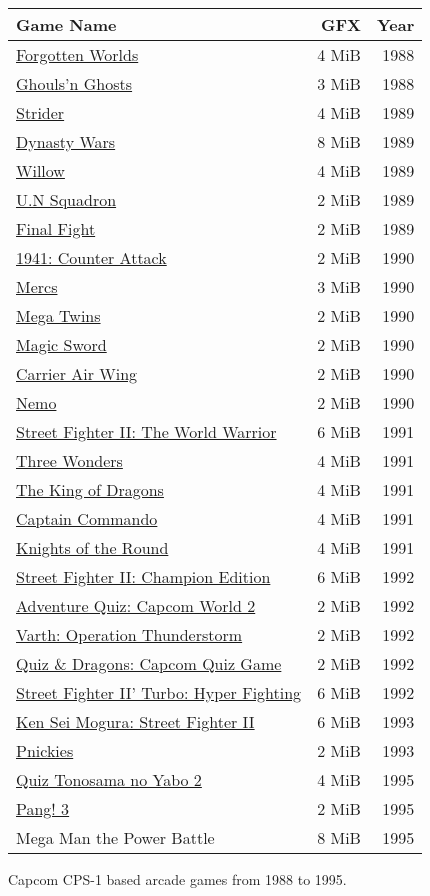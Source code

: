 \begin{figure}[H]
{ \setlength{\tabcolsep}{3.0pt}
\begin{tabularx}{\textwidth}{Xrr} 
  \textbf{Game Name} & \textbf{ GFX }  & \textbf{ Year } \\               
  \toprule    
\href{}{Forgotten Worlds} & 4 MiB & 1988 \\ 
\href{}{Ghouls'n Ghosts} & 3 MiB & 1988 \\ 
  \toprule    
\href{}{Strider} & 4 MiB & 1989 \\ 
\href{}{Dynasty Wars} & 8 MiB & 1989 \\ 
\href{}{Willow} & 4 MiB & 1989 \\ 
\href{}{U.N Squadron} & 2 MiB & 1989 \\ 
\href{}{Final Fight} & 2 MiB & 1989 \\ 
  \toprule    
\href{}{1941: Counter Attack} & 2 MiB &  1990 \\ 
\href{}{Mercs} &  3 MiB & 1990 \\ 
\href{}{Mega Twins} & 2 MiB & 1990 \\ 
\href{}{Magic Sword} & 2 MiB & 1990 \\ 
\href{}{Carrier Air Wing} & 2 MiB  & 1990 \\ 
\href{}{Nemo} & 2 MiB &  1990 \\ 
  \toprule    
\href{}{Street Fighter II: The World Warrior} & 6 MiB & 1991 \\ 
\href{}{Three Wonders} & 4 MiB & 1991 \\ 
\href{}{The King of Dragons} & 4 MiB & 1991 \\ 
\href{}{Captain Commando} &  4 MiB & 1991 \\ 
\href{}{Knights of the Round} & 4 MiB  & 1991 \\ 
  \toprule    
\href{}{Street Fighter II: Champion Edition} & 6 MiB & 1992 \\ 
\href{}{Adventure Quiz: Capcom World 2} & 2 MiB & 1992 \\ 
\href{}{Varth: Operation Thunderstorm} & 2 MiB & 1992 \\ 
\href{}{Quiz \& Dragons: Capcom Quiz Game} & 2 MiB & 1992 \\ 
\href{}{Street Fighter II' Turbo: Hyper Fighting} &  6 MiB & 1992 \\ 
  \toprule    
\href{}{Ken Sei Mogura: Street Fighter II} & 6 MiB & 1993 \\ 
\href{}{Pnickies} & 2 MiB & 1993 \\ 
  \toprule    
\href{}{Quiz Tonosama no Yabo 2} &  4 MiB & 1995 \\ 
\href{}{Pang! 3} & 2 MiB  & 1995 \\ 
Mega Man the Power Battle & 8 MiB  & 1995 \\

\toprule    
\end{tabularx}%
}\caption*{Capcom CPS-1 based arcade games from 1988 to 1995.}
\end{figure}




